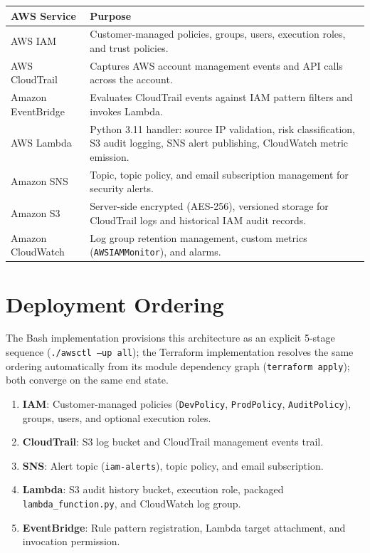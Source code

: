 \documentclass[11pt,a4paper]{report}
\newcommand{\techtable}[3]{%
\begin{center}
\renewcommand{\arraystretch}{1.3}
\begin{tabularx}{\linewidth}{l X}
\toprule
\textbf{#2} & \textbf{#3} \\
\midrule
#1
\bottomrule
\end{tabularx}
\end{center}
}
\begin{document}
\techtable{
AWS IAM & Customer-managed policies, groups, users, execution roles, and trust policies. \\
AWS CloudTrail & Captures AWS account management events and API calls across the account. \\
Amazon EventBridge & Evaluates CloudTrail events against IAM pattern filters and invokes Lambda. \\
AWS Lambda & Python 3.11 handler: source IP validation, risk classification, S3 audit logging, SNS alert publishing, CloudWatch metric emission. \\
Amazon SNS & Topic, topic policy, and email subscription management for security alerts. \\
Amazon S3 & Server-side encrypted (AES-256), versioned storage for CloudTrail logs and historical IAM audit records. \\
Amazon CloudWatch & Log group retention management, custom metrics (\texttt{AWSIAMMonitor}), and alarms. \\
}{AWS Service}{Purpose}

\section{Deployment Ordering}

The Bash implementation provisions this architecture as an explicit 5-stage
sequence (\texttt{./awsctl --up all}); the Terraform implementation resolves
the same ordering automatically from its module dependency graph
(\texttt{terraform apply}); both converge on the same end state.

\begin{enumerate}[leftmargin=1.6em]
  \item \textbf{IAM}: Customer-managed policies (\texttt{DevPolicy}, \texttt{ProdPolicy}, \texttt{AuditPolicy}), groups, users, and optional execution roles.
  \item \textbf{CloudTrail}: S3 log bucket and CloudTrail management events trail.
  \item \textbf{SNS}: Alert topic (\texttt{iam-alerts}), topic policy, and email subscription.
  \item \textbf{Lambda}: S3 audit history bucket, execution role, packaged \texttt{lambda\_function.py}, and CloudWatch log group.
  \item \textbf{EventBridge}: Rule pattern registration, Lambda target attachment, and invocation permission.
\end{enumerate}
\end{document}
